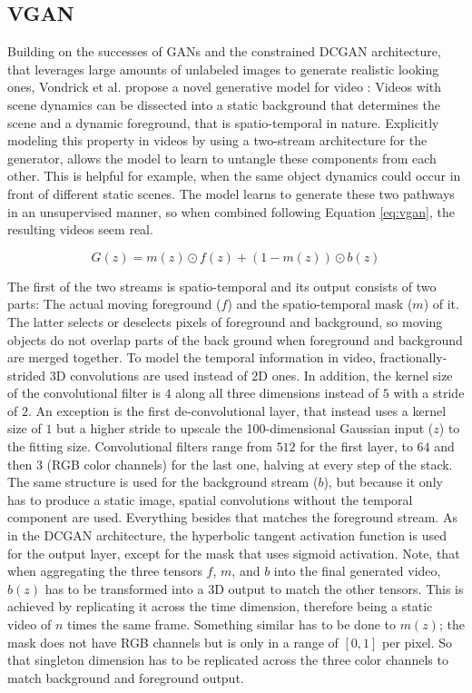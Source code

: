 \subsection{VGAN} \label{subsec:vgan_mod}

Building on the successes of GANs and the constrained DCGAN architecture, that leverages large amounts of unlabeled images to generate realistic looking ones, Vondrick et al. propose a novel generative model for video \cite{vondrick2016generating}: Videos with scene dynamics can be dissected into a static background that determines the scene and a dynamic foreground, that is spatio-temporal in nature. Explicitly modeling this property in videos by using a two-stream architecture for the generator, allows the model to learn to untangle these components from each other. This is helpful for example, when the same object dynamics could occur in front of different static scenes. The model learns to generate these two pathways in an unsupervised manner, so when combined following Equation \ref{eq:vgan}, the resulting videos seem real.

\begin{equation} \label{eq:vgan}
G(z)=m(z) \odot f(z) + (1-m(z)) \odot b(z)
\end{equation}

The first of the two streams is spatio-temporal and its output consists of two parts: The actual moving foreground ($f$) and the spatio-temporal mask ($m$) of it. The latter selects or deselects pixels of foreground and background, so moving objects do not overlap parts of the back ground when foreground and background are merged together. To model the temporal information in video, fractionally-strided 3D convolutions are used instead of 2D ones. In addition, the kernel size of the convolutional filter is $4$ along all three dimensions instead of $5$ with a stride of $2$. An exception is the first de-convolutional layer, that instead uses a kernel size of $1$ but a higher stride to upscale the 100-dimensional Gaussian input ($z$) to the fitting size. Convolutional filters range from $512$ for the first layer, to $64$ and then $3$ (RGB color channels) for the last one, halving at every step of the stack. The same structure is used for the background stream ($b$), but because it only has to produce a static image, spatial convolutions without the temporal component are used. Everything besides that matches the foreground stream. As in the DCGAN architecture, the hyperbolic tangent activation function is used for the output layer, except for the mask that uses sigmoid activation. Note, that when aggregating the three tensors $f$, $m$, and $b$ into the final generated video, $b(z)$ has to be transformed into a 3D output to match the other tensors. This is achieved by replicating it across the time dimension, therefore being a static video of $n$ times the same frame. Something similar has to be done to $m(z)$; the mask does not have RGB channels but is only in a range of $[0,1]$ per pixel. So that singleton dimension has to be replicated across the three color channels to match background and foreground output.

